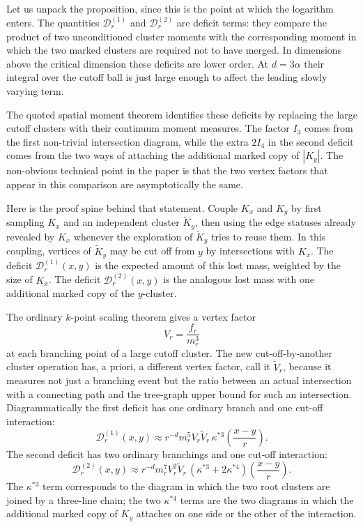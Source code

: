 \documentclass[11pt,reqno]{book}
\numberwithin{equation}{chapter}
\theoremstyle{plain}
\theoremstyle{definition}
\theoremstyle{remark}
\newcommand{\1}{\mathbf 1}
\begin{document}
Let us unpack the proposition, since this is the point at which the
logarithm enters. The quantities \(\mathscr D_r^{(1)}\) and
\(\mathscr D_r^{(2)}\) are deficit terms: they compare the product of two
unconditioned cluster moments with the corresponding moment in which the two
marked clusters are required not to have merged. In dimensions above the
critical dimension these deficits are lower order. At \(d=3\alpha\) their
integral over the cutoff ball is just large enough to affect the leading
slowly varying term.

The quoted spatial moment theorem identifies these deficits by replacing the
large cutoff clusters with their continuum moment measures. The factor
\(I_3\) comes from the first non-trivial intersection diagram, while the
extra \(2I_4\) in the second deficit comes from the two ways of attaching the
additional marked copy of \(|K_y|\). The non-obvious technical point in the
paper is that the two vertex factors that appear in this comparison are
asymptotically the same.

Here is the proof spine behind that statement. Couple \(K_x\) and \(K_y\) by
first sampling \(K_x\) and an independent cluster \(\widetilde K_y\), then
using the edge statuses already revealed by \(K_x\) whenever the exploration
of \(\widetilde K_y\) tries to reuse them. In this coupling, vertices of
\(\widetilde K_y\) may be cut off from \(y\) by intersections with \(K_x\).
The deficit \(\mathscr D_r^{(1)}(x,y)\) is the expected amount of this lost
mass, weighted by the size of \(K_x\). The deficit
\(\mathscr D_r^{(2)}(x,y)\) is the analogous lost mass with one additional
marked copy of the \(y\)-cluster.

The ordinary \(k\)-point scaling theorem gives a vertex factor
\[
  V_r=\frac{f_r}{m_r^3}
\]
at each branching point of a large cutoff cluster. The new cut-off-by-another
cluster operation has, a priori, a different vertex factor, call it
\(\widetilde V_r\), because it measures not just a branching event but the
ratio between an actual intersection with a connecting path and the
tree-graph upper bound for such an intersection. Diagrammatically the first
deficit has one ordinary branch and one cut-off interaction:
\[
  \mathscr D_r^{(1)}(x,y)
  \approx
  r^{-d}m_r^5 V_r\widetilde V_r\,
  \kappa^{*3}\!\left(\frac{x-y}{r}\right).
\]
The second deficit has two ordinary branchings and one cut-off interaction:
\[
  \mathscr D_r^{(2)}(x,y)
  \approx
  r^{-d}m_r^7 V_r^2\widetilde V_r\,
  \left(\kappa^{*3}+2\kappa^{*4}\right)
  \!\left(\frac{x-y}{r}\right).
\]
The \(\kappa^{*3}\) term corresponds to the diagram in which the two root
clusters are joined by a three-line chain; the two \(\kappa^{*4}\) terms are
the two diagrams in which the additional marked copy of \(K_y\) attaches on
one side or the other of the interaction.
\end{document}
